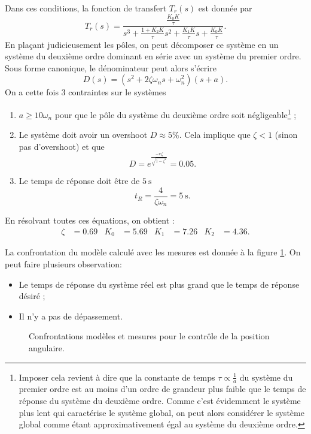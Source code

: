 \documentclass[frenchb, paper=a4, fontsize=11pt]{scrartcl}
\numberwithin{equation}{section}					%
\numberwithin{figure}{section}					%
\numberwithin{table}{section}						%
\begin{document}
Dans ces conditions, la fonction de transfert $T_r(s)$ est donnée par
\begin{equation}
	T_r(s) = \frac{\frac{K_0K}{\tau}}{s^3 + \frac{1+K_2K}{\tau}s^2 + \frac{K_1K}{\tau}s + \frac{K_0K}{\tau}}.
\end{equation}
En plaçant judicieusement les pôles, on peut décomposer ce système en un système
du deuxième ordre dominant en série avec un système du premier ordre. Sous forme
canonique, le dénominateur peut alors s'écrire
\begin{equation}
	D(s) = (s^2 + 2\zeta\omega_ns + \omega_n^2)(s+a).
\end{equation}
On a cette fois 3 contraintes sur le systèmes
\begin{enumerate}
	\item $a \geq 10\omega_n$ pour que le pôle du système du deuxième ordre soit
	négligeable\footnote{Imposer cela revient à dire que la constante de temps $\tau
	\propto \frac{1}{a}$ du système du premier ordre est au moins d'un ordre de
	grandeur plus faible que le temps de réponse du système du deuxième ordre. Comme
	c'est évidemment le système plus lent qui caractérise le système global, on peut
	alors considérer le système global comme étant approximativement égal au
	système du deuxième ordre.} ;
	\item Le système doit avoir un overshoot $D \approx 5\%$. Cela implique que
	$\zeta < 1$ (sinon pas d'overshoot) et que
	\begin{equation}
		D = e^{\frac{-\pi\zeta}{\sqrt{1-\zeta^2}}} = 0.05.
	\end{equation}
	\item Le temps de réponse doit être de $\SI{5}{\second}$
	\begin{equation}
		t_R = \frac{4}{\zeta\omega_n} = \SI{5}{\second}.
	\end{equation}
\end{enumerate}
En résolvant toutes ces équations, on obtient :
\begin{align}
	\zeta & = 0.69 & K_0 & = 5.69 & K_1 & = 7.26 &  K_2 & = 4.36.
\end{align}

La confrontation du modèle calculé avec les mesures est donnée à la
figure \ref{fig:position_control}. On peut faire plusieurs
observation:
\begin{itemize}
	\item Le temps de réponse du système réel est plus grand que le temps
	de réponse désiré ;
	\item Il n'y a pas de dépassement.
\end{itemize}

\begin{figure}[ht]
	\centering
	
	\caption{Confrontations modèles et mesures pour le contrôle
	de la position angulaire.}
	\label{fig:position_control}
\end{figure}
\end{document}
